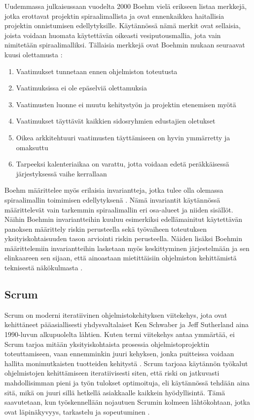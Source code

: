 \documentclass[finnish,nonumbib,nocopyright]{gradu2}
\begin{document}
Uudemmassa julkaisussaan vuodelta 2000 Boehm \cite{spiral2} vielä erikseen listaa merkkejä, jotka erottavat projektin spiraalimallista ja ovat ennenkaikkea haitallisia projektin onnistumisen edellytyksille. Käytännössä nämä merkit ovat sellaisia, joista voidaan huomata käytettävän oikeasti vesiputousmallia, jota vain nimitetään spiraalimalliksi. Tällaisia merkkejä ovat Boehmin mukaan seuraavat kuusi olettamusta \cite{spiral2}:
\begin{enumerate}
\item Vaatimukset tunnetaan ennen ohjelmiston toteutusta
\item Vaatimuksissa ei ole epäselviä olettamuksia
\item Vaatimusten luonne ei muutu kehitystyön ja projektin etenemisen myötä
\item Vaatimukset täyttävät kaikkien sidosryhmien edustajien oletukset
\item Oikea arkkitehtuuri vaatimusten täyttämiseen on hyvin ymmärretty ja omaksuttu
\item Tarpeeksi kalenteriaikaa on varattu, jotta voidaan edetä peräkkäisessä järjestyksessä vaihe kerrallaan
\end{enumerate}

Boehm määrittelee myös erilaisia invariantteja, jotka tulee olla olemassa spiraalimallin toimimisen edellytyksenä \cite{spiral2}. Nämä invariantit käytännössä määrittelevät vain tarkemmin spiraalimallin eri osa-alueet ja niiden sisällöt. Näihin Boehmin invariantteihin kuuluu esimerkiksi edellämainitut käytettävän panoksen määrittely riskin perusteella sekä työvaiheen toteutuksen yksityiskohtaisuuden tason arviointi riskin perusteella. Näiden lisäksi Boehmin määrittelemiin invariantteihin lasketaan myös keskittyminen järjestelmään ja sen elinkaareen sen sijaan, että ainoastaan mietittäisiin ohjelmiston kehittämistä teknisestä näkökulmasta \cite{spiral2}.

\subsection{Scrum}

Scrum on moderni iteratiivinen ohjelmistokehityksen viitekehys, jota ovat kehittäneet pääasiallisesti yhdysvaltalaiset Ken Schwaber ja Jeff Sutherland aina 1990-luvun alkupuolelta lähtien. Kuten termi viitekehys antaa ymmärtää, ei Scrum tarjoa mitään yksityiskohtaista prosessia ohjelmistoprojektin toteuttamiseen, vaan ennemminkin juuri kehyksen, jonka puitteissa voidaan hallita monimutkaisten tuotteiden kehitystä \cite{scrumguide}. Scrum tarjoaa käytännön työkalut ohjelmistojen kehittämiseen iteratiivisesti siten, että riski on jatkuvasti mahdollisimman pieni ja työn tulokset optimoituja, eli käytännössä tehdään aina sitä, mikä on juuri sillä hetkellä asiakkaalle kaikkein hyödyllisintä. Tämä saavutetaan, kun työskennellään nojautuen Scrumin kolmeen lähtökohtaan, jotka ovat läpinäkyvyys, tarkastelu ja sopeutuminen \cite{scrumguide}.
\end{document}
